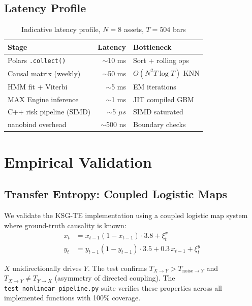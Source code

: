 \documentclass[12pt,a4paper]{article}
\begin{document}
\subsection{Latency Profile}

\begin{table}[h]
\centering
\caption{Indicative latency profile, $N=8$ assets, $T=504$ bars}
\label{tab:latency}
\begin{tabular}{lrl}
\toprule
\textbf{Stage} & \textbf{Latency} & \textbf{Bottleneck} \\
\midrule
Polars \texttt{.collect()} & $\sim$10 ms & Sort + rolling ops \\
Causal matrix (weekly) & $\sim$50 ms & $O(N^2 T \log T)$ KNN \\
HMM fit + Viterbi & $\sim$5 ms & EM iterations \\
MAX Engine inference & $\sim$1 ms & JIT compiled GBM \\
C++ risk pipeline (SIMD) & $\sim$5 $\mu s$ & SIMD saturated \\
nanobind overhead & $\sim$500 ns & Boundary checks \\
\bottomrule
\end{tabular}
\end{table}

\section{Empirical Validation}

\subsection{Transfer Entropy: Coupled Logistic Maps}

We validate the KSG-TE implementation using a coupled logistic map system
where ground-truth causality is known:
\begin{align}
    x_t &= x_{t-1}(1 - x_{t-1}) \cdot 3.8 + \xi_t^x \\
    y_t &= y_{t-1}(1 - y_{t-1}) \cdot 3.5 + 0.3\, x_{t-1} + \xi_t^y
\end{align}

$X$ unidirectionally drives $Y$. The test confirms $T_{X \to Y} > T_{\text{noise} \to Y}$
and $T_{X \to Y} \neq T_{Y \to X}$ (asymmetry of directed coupling). The
\texttt{test\_nonlinear\_pipeline.py} suite verifies these properties across all
implemented functions with 100\% coverage.
\end{document}
